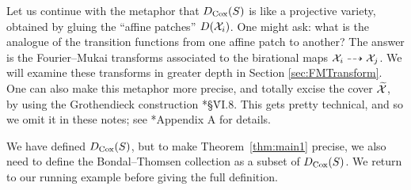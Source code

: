 \documentclass{amsart}
\begin{document}
\begin{remark}
Let us continue with the metaphor that $D_{\operatorname{Cox}}(S)$ is like a projective variety, obtained by gluing the ``affine patches'' $D(\mathcal X_i)$.  One might ask:  what is the analogue of the transition functions from one affine patch to another?  The answer is the Fourier--Mukai transforms associated to the birational maps $\mathcal X_i \dashrightarrow \mathcal X_j$.  We will examine these transforms in greater depth in Section \ref{sec:FMTransform}.
One can also make this metaphor more precise, and totally excise the cover $\widetilde{\mathcal X}$, by using the Grothendieck construction \cite{SGA1}*{\S\.VI.8}.  This gets pretty technical, and so we omit it in these notes; see \cite{BBB+24}*{Appendix A} for details.
\end{remark}


We have defined $D_{\operatorname{Cox}}(S)$, but to make Theorem~\ref{thm:main1} precise, we also need to define the Bondal--Thomsen collection as a subset of $D_{\operatorname{Cox}}(S)$.  We  return to our running example before giving the full definition.


\end{document}
